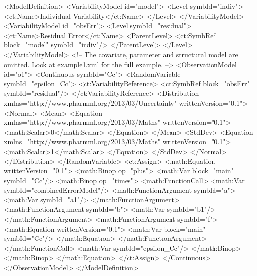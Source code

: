 \documentclass[a4paper,11pt]{article}
\begin{document}
\begin{xmlcode}
<ModelDefinition>
    <VariabilityModel id="model">
        <Level symbId="indiv">
            <ct:Name>Individual Variability</ct:Name>
        </Level>
    </VariabilityModel>
    <VariabilityModel id="obsErr">
        <Level symbId="residual">
            <ct:Name>Residual Error</ct:Name>
            <ParentLevel>
                <ct:SymbRef block="model" symbId="indiv"/>
            </ParentLevel>
        </Level>
    </VariabilityModel>
    <!-- 
       The covariate, parameter and structural model are omitted. Look at
       example1.xml for the full example.
       -->
    <ObservationModel id="o1">
        <Continuous symbId="Cc">
            <RandomVariable symbId="epsilon_Cc">
                <ct:VariabilityReference>
                    <ct:SymbRef block="obsErr" symbId="residual"/>
                </ct:VariabilityReference>
                <Distribution xmlns="http://www.pharmml.org/2013/03/Uncertainty"
                    writtenVersion="0.1">
                    <Normal>
                        <Mean>
                            <Equation xmlns="http://www.pharmml.org/2013/03/Maths"
                                writtenVersion="0.1">
                                <math:Scalar>0</math:Scalar>
                            </Equation>
                        </Mean>
                        <StdDev>
                            <Equation xmlns="http://www.pharmml.org/2013/03/Maths"
                                writtenVersion="0.1">
                                <math:Scalar>1</math:Scalar>
                            </Equation>
                        </StdDev>
                    </Normal>
                </Distribution>
            </RandomVariable>
            <ct:Assign>
                <math:Equation writtenVersion="0.1">
                    <math:Binop op="plus">
                        <math:Var block="main" symbId="Cc"/>
                        <math:Binop op="times">
                            <math:FunctionCall>
                                <math:Var symbId="combinedErrorModel"/>
                                <math:FunctionArgument symbId="a">
                                    <math:Var symbId="a1"/>
                                </math:FunctionArgument>
                                <math:FunctionArgument symbId="b">
                                    <math:Var symbId="b1"/>
                                </math:FunctionArgument>
                                <math:FunctionArgument symbId="f">
                                    <math:Equation writtenVersion="0.1">
                                        <math:Var block="main" symbId="Cc"/>
                                    </math:Equation>
                                </math:FunctionArgument>
                            </math:FunctionCall>
                            <math:Var symbId="epsilon_Cc"/>
                        </math:Binop>
                    </math:Binop>
                </math:Equation>
            </ct:Assign>
        </Continuous>
    </ObservationModel>
</ModelDefinition>
\end{xmlcode}
\end{document}
